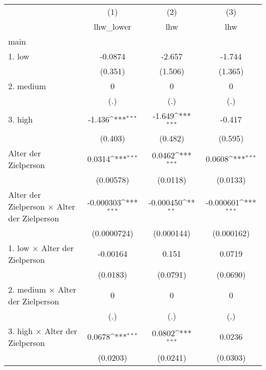 {
\def\sym#1{\ifmmode^{#1}\else\(^{#1}\)\fi}
\begin{tabular}{l*{3}{c}}
\hline\hline
                    &\multicolumn{1}{c}{(1)}&\multicolumn{1}{c}{(2)}&\multicolumn{1}{c}{(3)}\\
                    &\multicolumn{1}{c}{lhw\_lower}&\multicolumn{1}{c}{lhw}&\multicolumn{1}{c}{lhw}\\
\hline
main                &                     &                     &                     \\
1. low              &     -0.0874         &      -2.657         &      -1.744         \\
                    &     (0.351)         &     (1.506)         &     (1.365)         \\
[1em]
2. medium           &           0         &           0         &           0         \\
                    &         (.)         &         (.)         &         (.)         \\
[1em]
3. high             &      -1.436\sym{***}&      -1.649\sym{***}&      -0.417         \\
                    &     (0.403)         &     (0.482)         &     (0.595)         \\
[1em]
Alter der Zielperson&      0.0314\sym{***}&      0.0462\sym{***}&      0.0608\sym{***}\\
                    &   (0.00578)         &    (0.0118)         &    (0.0133)         \\
[1em]
Alter der Zielperson $\times$ Alter der Zielperson&   -0.000303\sym{***}&   -0.000450\sym{**} &   -0.000601\sym{***}\\
                    & (0.0000724)         &  (0.000144)         &  (0.000162)         \\
[1em]
1. low $\times$ Alter der Zielperson&    -0.00164         &       0.151         &      0.0719         \\
                    &    (0.0183)         &    (0.0791)         &    (0.0690)         \\
[1em]
2. medium $\times$ Alter der Zielperson&           0         &           0         &           0         \\
                    &         (.)         &         (.)         &         (.)         \\
[1em]
3. high $\times$ Alter der Zielperson&      0.0678\sym{***}&      0.0802\sym{***}&      0.0236         \\
                    &    (0.0203)         &    (0.0241)         &    (0.0303)         \\

\end{tabular}}

